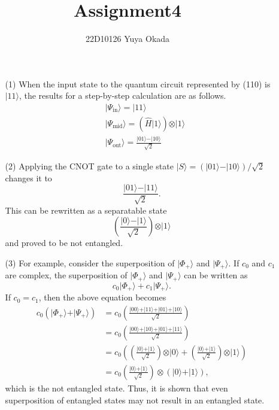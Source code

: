 \documentclass{jarticle}
\newcommand{\qubit}[1]{\vert{#1}\rangle}
\begin{document}
\title{Assignment4}
\author{22D10126 Yuya Okada}
\date{}
\maketitle

\begin{itemize}
    \item[\fbox{$\spadesuit$Q22}]
        \begin{enumerate}

        \item[(1)] When the input state to the quantum circuit represented by (110) is $\qubit{11}$, 
            the results for a step-by-step calculation are as follows.
            \begin{align}
                &\qubit{\Psi_{\mathrm{in}}} = \qubit{11}\\
                &\qubit{\Psi_{\mathrm{mid}}} = \left(\hat{H}\qubit{1}\right)\otimes\qubit{1}\\
                &\qubit{\Psi_{\mathrm{out}}} = \frac{\qubit{01}-\qubit{10}}{\sqrt{2}}
            \end{align}

        \item[(2)] Applying the CNOT gate to a single state $\qubit{S}=(\qubit{01}-\qubit{10})/\sqrt{2}$ changes it to
            \begin{equation}
                \frac{\qubit{01}-\qubit{11}}{\sqrt{2}}.
            \end{equation}
            This can be rewritten as a separatable state
            \begin{equation}
                \left(\frac{\qubit{0}-\qubit{1}}{\sqrt{2}}\right)\otimes\qubit{1}
            \end{equation} 
            and proved to be not entangled.
        \item[(3)] For example, consider the superposition of $\qubit{\Phi_+}$ and $\qubit{\Psi_+}$.
            If $c_0$ and $c_1$ are complex, the superposition of $\qubit{\Phi_+}$ and $\qubit{\Psi_+}$ can be written as
            \begin{equation}
                c_0\qubit{\Phi_+} + c_1\qubit{\Psi_+}.
            \end{equation}
            If $c_0=c_1$, then the above equation becomes
            \begin{align}
                c_0(\qubit{\Phi_+} + \qubit{\Psi_+}) &= c_0\left(\frac{\qubit{00}+\qubit{11}+\qubit{01}+\qubit{10}}{\sqrt{2}}\right)\nonumber\\
                &=c_0\left(\frac{\qubit{00}+\qubit{10}+\qubit{01}+\qubit{11}}{\sqrt{2}}\right)\nonumber\\
                &=c_0\left(\left(\frac{\qubit{0}+\qubit{1}}{\sqrt{2}}\right)\otimes\qubit{0}+\left(\frac{\qubit{0}+\qubit{1}}{\sqrt{2}}\right)\otimes\qubit{1}\right)\nonumber\\
                &=c_0\left(\frac{\qubit{0}+\qubit{1}}{\sqrt{2}}\right)\otimes(\qubit{0}+\qubit{1}),
            \end{align}
            which is the not entangled state.
            Thus, it is shown that even superposition of entangled states may not result in an entangled state.


\end{enumerate}
\end{itemize}
\end{document}
